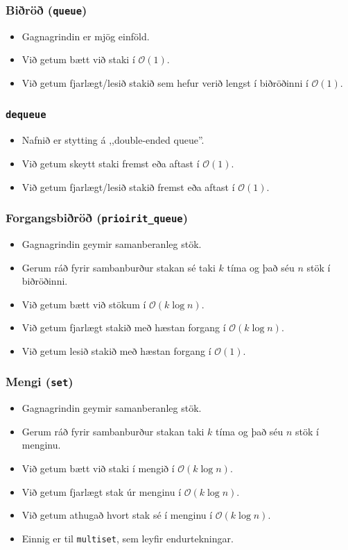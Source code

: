 \documentclass{beamer}
\begin{document}
\begin{frame}
\frametitle{Biðröð (\texttt{queue})}
\begin{itemize}
	\item Gagnagrindin er mjög einföld.
	\item Við getum bætt við staki í $\mathcal{O}(1)$.
	\item Við getum fjarlægt/lesið stakið sem hefur verið lengst í biðröðinni í $\mathcal{O}(1)$.
\end{itemize}
\end{frame}

\begin{frame}
\frametitle{\texttt{dequeue}}
\begin{itemize}
	\item Nafnið er stytting á ,,double-ended queue''.
	\item Við getum skeytt staki fremst eða aftast í $\mathcal{O}(1)$.
	\item Við getum fjarlægt/lesið stakið fremst eða aftast í $\mathcal{O}(1)$.
\end{itemize}
\end{frame}

\begin{frame}
\frametitle{Forgangsbiðröð (\texttt{prioirit\_queue})}
\begin{itemize}
	\item Gagnagrindin geymir samanberanleg stök.
	\item Gerum ráð fyrir sambanburður stakan sé taki $k$ tíma og það séu $n$ stök í biðröðinni.
	\item Við getum bætt við stökum í $\mathcal{O}(k \log n)$.
	\item Við getum fjarlægt stakið með hæstan forgang í $\mathcal{O}(k \log n)$.
	\item Við getum lesið stakið með hæstan forgang í $\mathcal{O}(1)$.
\end{itemize}
\end{frame}

\begin{frame}
\frametitle{Mengi (\texttt{set})}
\begin{itemize}
	\item Gagnagrindin geymir samanberanleg stök.
	\item Gerum ráð fyrir sambanburður stakan taki $k$ tíma og það séu $n$ stök í menginu.
	\item Við getum bætt við staki í mengið í $\mathcal{O}(k \log n)$.
	\item Við getum fjarlægt stak úr menginu í $\mathcal{O}(k \log n)$.
	\item Við getum athugað hvort stak sé í menginu í $\mathcal{O}(k \log n)$.
	\item Einnig er til \texttt{multiset}, sem leyfir endurtekningar.
\end{itemize}
\end{frame}
\end{document}
